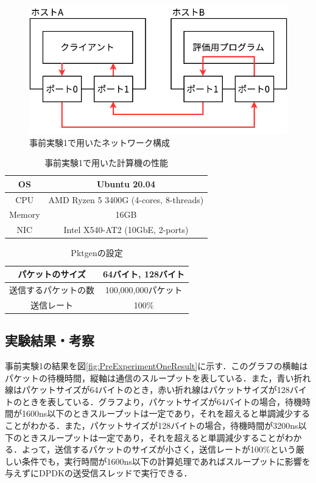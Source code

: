 \begin{figure}[htb]
  \centering
  \includegraphics[width=\columnwidth]{pictures/PreExperimentNetwork.pdf}
  \caption{事前実験1で用いたネットワーク構成}
  \label{fig:PreExperimentNetwork}
\end{figure}

\begin{table}[htb]
  \centering
  \caption{事前実験1で用いた計算機の性能}
  \begin{tabular}{|c|c|} \hline
    OS     & Ubuntu 20.04                           \\ \hline
    CPU    & AMD Ryzen 5 3400G (4-cores, 8-threads) \\ \hline
    Memory & 16GB                                   \\ \hline
    NIC    & Intel X540-AT2 (10GbE, 2-ports)        \\ \hline
  \end{tabular}
  \label{tab:MachineSpec}
\end{table}

\begin{table}[htb]
  \centering
  \caption{Pktgenの設定}
  \begin{tabular}{|c|c|} \hline
    パケットのサイズ     & 64バイト, 128バイト \\ \hline
    送信するパケットの数 & 100,000,000パケット \\ \hline
    送信レート           & 100\%               \\ \hline
  \end{tabular}
  \label{tab:PktgenSettings}
\end{table}

\subsection{実験結果・考察}
事前実験1の結果を図\ref{fig:PreExperimentOneResult}に示す．このグラフの横軸はパケットの待機時間，縦軸は通信のスループットを表している．また，青い折れ線はパケットサイズが64バイトのとき，赤い折れ線はパケットサイズが128バイトのときを表している．グラフより，パケットサイズが64バイトの場合，待機時間が1600ns以下のときスループットは一定であり，それを超えると単調減少することがわかる．また，パケットサイズが128バイトの場合，待機時間が3200ns以下のときスループットは一定であり，それを超えると単調減少することがわかる．よって，送信するパケットのサイズが小さく，送信レートが100\%という厳しい条件でも，実行時間が1600ns以下の計算処理であればスループットに影響を与えずにDPDKの送受信スレッドで実行できる．

